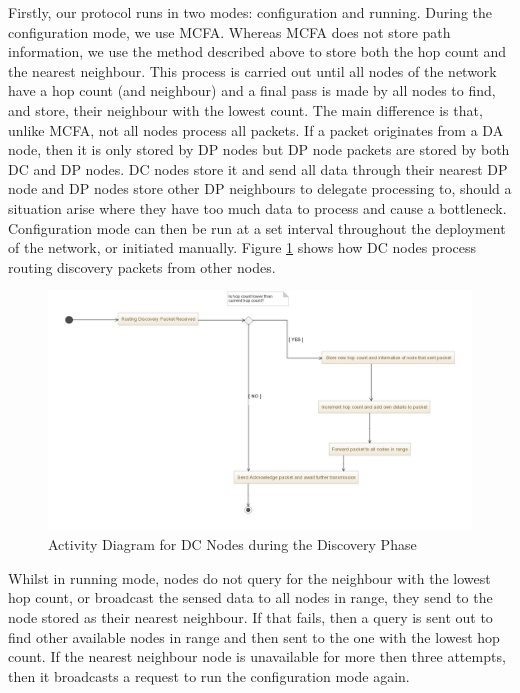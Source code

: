 		Firstly, our protocol runs in two modes: configuration and running. During the configuration mode, we use MCFA. Whereas MCFA does not store path information, we use the method described above to store both the hop count and the nearest neighbour. This process is carried out until all nodes of the network have a hop count (and neighbour) and a final pass is made by all nodes to find, and store, their neighbour with the lowest count. The main difference is that, unlike MCFA, not all nodes process all packets. If a packet originates from a DA node, then it is only stored by DP nodes but DP node packets are stored by both DC and DP nodes. DC nodes store it and send all data through their nearest DP node and DP nodes store other DP neighbours to delegate processing to, should a situation arise where they have too much data to process and cause a bottleneck. Configuration mode can then be run at a set interval throughout the deployment of the network, or initiated manually. Figure \ref{fig:dc:discovery} shows how DC nodes process routing discovery packets from other nodes.

		\begin{figure}[h]
		\centering
		\includegraphics[width=\textwidth]{Chap4/figures/dc_activity}
		\caption{Activity Diagram for DC Nodes during the Discovery Phase}
		\label{fig:dc:discovery}
		\end{figure}

		Whilst in running mode, nodes do not query for the neighbour with the lowest hop count, or broadcast the sensed data to all nodes in range, they send to the node stored as their nearest neighbour. If that fails, then a query is sent out to find other available nodes in range and then sent to the one with the lowest hop count. If the nearest neighbour node is unavailable for more then three attempts, then it broadcasts a request to run the configuration mode again.

